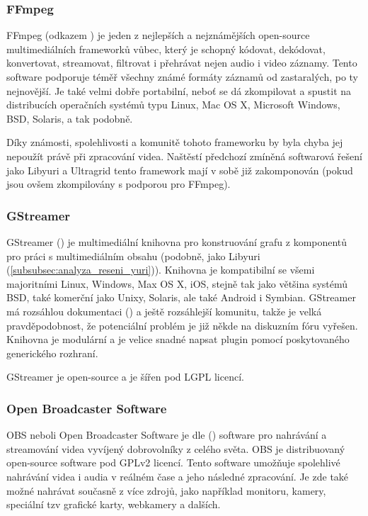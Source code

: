 \documentclass[thesis=M,czech]{FITthesis}[2012/06/26]
\begin{document}
\subsubsection{FFmpeg} \label{subsubsec:analyza_reseni_ffmpeg}
FFmpeg (odkazem \cite{ffmpeg}) je jeden z nejlepších a nejznámějších open-source multimediálních frameworků vůbec, který je schopný kódovat, dekódovat, konvertovat, streamovat, filtrovat i přehrávat nejen audio i video záznamy. Tento software podporuje téměř všechny známé formáty záznamů od zastaralých, po ty nejnovější. Je také velmi dobře portabilní, neboť se dá zkompilovat a spustit na distribucích operačních systémů typu Linux, Mac OS X, Microsoft Windows, BSD, Solaris, a tak podobně.

	Díky známosti, spolehlivosti a komunitě tohoto frameworku by byla chyba jej nepoužít právě při zpracování videa. Naštěstí předchozí zmíněná softwarová řešení jako Libyuri a Ultragrid tento framework mají v sobě již zakomponován (pokud jsou ovšem zkompilovány s podporou pro FFmpeg).

\subsubsection{GStreamer} \label{subsubsec:analyza_reseni_gstreamer}
GStreamer (\cite{gstreamer}) je multimediální knihovna pro konstruování grafu z komponentů pro práci s multimediálním obsahu (podobně, jako Libyuri (\ref{subsubsec:analyza_reseni_yuri})). Knihovna je kompatibilní se všemi majoritními Linux, Windows, Max OS X, iOS, stejně tak jako většina systémů BSD, také komerční jako Unixy, Solaris, ale také Android i Symbian. GStreamer má rozsáhlou dokumentaci (\cite{gstreamer_doc}) a ještě rozsáhlejší komunitu, takže je velká pravděpodobnost, že potenciální problém je již někde na diskuzním fóru vyřešen. Knihovna je modulární a je velice snadné napsat plugin pomocí poskytovaného generického rozhraní.

	GStreamer je open-source a je šířen pod LGPL licencí.

\subsubsection{Open Broadcaster Software} \label{subsubsec:analyza_reseni_obs}
OBS neboli Open Broadcaster Software je dle (\cite{obs}) software pro nahrávání a streamování videa vyvíjený dobrovolníky z celého světa. OBS je distribuovaný open-source software pod GPLv2 licencí. Tento software umožňuje spolehlivé nahrávání videa i audia v reálném čase a jeho následné zpracování. Je zde také možné nahrávat současně z více zdrojů, jako například monitoru, kamery, speciální tzv  grafické karty, webkamery a dalších.
\end{document}

